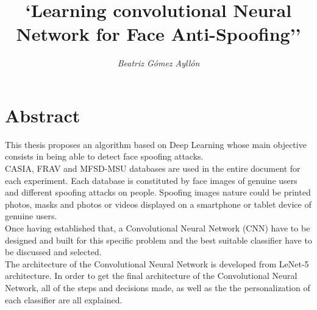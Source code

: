 \documentclass[12pt,a4paper,titlepage,twoside]{book}
\title{\Huge \textbf{`Learning convolutional Neural Network for Face Anti-Spoofing''}}
\author{\Huge \textit{Beatriz G\'omez Ayll\'on}}
\newcommand{\blankpage}{
\newpage \thispagestyle{empty}
\emph{  }
\newpage
}
\begin{document}
\mtcaddchapter %

\frontmatter
\marginsize{3.0cm}{2.0cm}{3.5cm}{2.5cm}


%




%


\maketitle

%

%	


\chapter*{Abstract}
This thesis proposes an algorithm based on Deep Learning whose main objective consists in being able to detect face spoofing attacks.\\

CASIA, FRAV and MFSD-MSU databases are used in the entire document for each experiment. Each database is constituted by face images of genuine users and different spoofing attacks on people. Spoofing images nature could be printed photos, masks and photos or videos displayed on a smartphone or tablet device of genuine users.\\

Once having established that, a Convolutional Neural Network (CNN) have to be designed and built for this specific problem and the best suitable classifier have to be discussed and selected.\\

The architecture of the Convolutional Neural Network is developed from LeNet-5 architecture. In order to get the final architecture of the Convolutional Neural Network, all of the steps and decisions made, as well as the  the personalization of each classifier are all explained.\\
\end{document}
